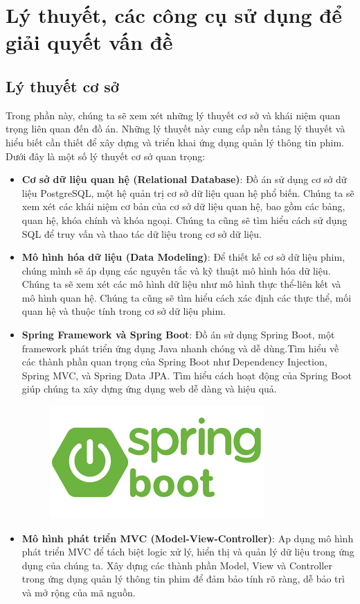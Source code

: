 \documentclass[12pt]{article}
\begin{document}
\section{Lý thuyết, các công cụ sử dụng để giải quyết vấn đề}
\subsection{Lý thuyết cơ sở}

Trong phần này, chúng ta sẽ xem xét những lý thuyết cơ sở và khái niệm quan trọng liên quan đến đồ án. Những lý thuyết này cung cấp nền tảng lý thuyết và hiểu biết cần thiết để xây dựng và triển khai ứng dụng quản lý thông tin phim. Dưới đây là một số lý thuyết cơ sở quan trọng:
\begin{itemize}
    \item \textbf{Cơ sở dữ liệu quan hệ (Relational Database)}: Đồ án sử dụng cơ sở dữ liệu PostgreSQL, một hệ quản trị cơ sở dữ liệu quan hệ phổ biến. Chúng ta sẽ xem xét các khái niệm cơ bản của cơ sở dữ liệu quan hệ, bao gồm các bảng, quan hệ, khóa chính và khóa ngoại. Chúng ta cũng sẽ tìm hiểu cách sử dụng SQL để truy vấn và thao tác dữ liệu trong cơ sở dữ liệu.

    \item \textbf{Mô hình hóa dữ liệu (Data Modeling)}: Để thiết kế cơ sở dữ liệu phim, chúng mình sẽ áp dụng các nguyên tắc và kỹ thuật mô hình hóa dữ liệu. Chúng ta sẽ xem xét các mô hình dữ liệu như mô hình thực thể-liên kết và mô hình quan hệ. Chúng ta cũng sẽ tìm hiểu cách xác định các thực thể, mối quan hệ và thuộc tính trong cơ sở dữ liệu phim.

    \item \textbf{Spring Framework và Spring Boot}: Đồ án sử dụng Spring Boot, một framework phát triển ứng dụng Java nhanh chóng và dễ dùng.Tìm hiểu về các thành phần quan trọng của Spring Boot như Dependency Injection, Spring MVC, và Spring Data JPA. Tìm hiểu cách hoạt động của Spring Boot giúp chúng ta xây dựng ứng dụng web dễ dàng và hiệu quả.
    \begin{figure}[H]
        \centering
        \includegraphics[scale=0.6]{Figs/spring-logo.png}
    \end{figure}
    \item \textbf{Mô hình phát triển MVC (Model-View-Controller)}: Ap dụng mô hình phát triển MVC để tách biệt logic xử lý, hiển thị và quản lý dữ liệu trong ứng dụng của chúng ta. Xây dựng các thành phần Model, View và Controller trong ứng dụng quản lý thông tin phim để đảm bảo tính rõ ràng, dễ bảo trì và mở rộng của mã nguồn.

\end{itemize}
\end{document}
